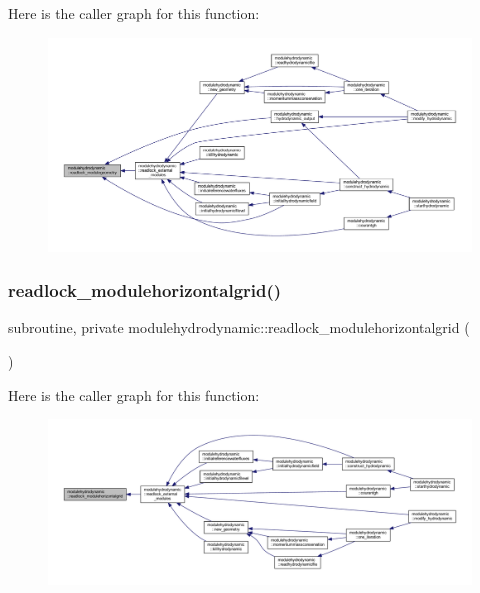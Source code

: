 Here is the caller graph for this function\+:\nopagebreak
\begin{figure}[H]
\begin{center}
\leavevmode
\includegraphics[width=350pt]{namespacemodulehydrodynamic_a1a5e2244778fa6a2caa0ff13ec7eb67b_icgraph}
\end{center}
\end{figure}
\mbox{\label{namespacemodulehydrodynamic_a87327c743a7173e47122b62474c77ea7}} 
\subsubsection{\texorpdfstring{readlock\+\_\+modulehorizontalgrid()}{readlock\_modulehorizontalgrid()}}
{\footnotesize\ttfamily subroutine, private modulehydrodynamic\+::readlock\+\_\+modulehorizontalgrid (\begin{DoxyParamCaption}{ }\end{DoxyParamCaption})\hspace{0.3cm}{\ttfamily [private]}}

Here is the caller graph for this function\+:\nopagebreak
\begin{figure}[H]
\begin{center}
\leavevmode
\includegraphics[width=350pt]{namespacemodulehydrodynamic_a87327c743a7173e47122b62474c77ea7_icgraph}
\end{center}
\end{figure}
\mbox{\label{namespacemodulehydrodynamic_a2b7951ef8d3385a7141d22cbca764a93}} 

